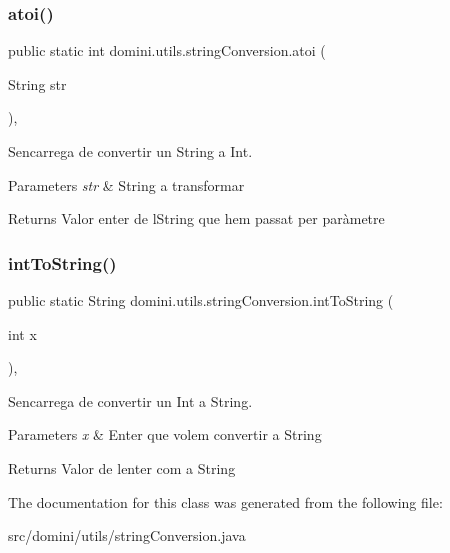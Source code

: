\subsubsection{\texorpdfstring{atoi()}{atoi()}}
{\footnotesize\ttfamily public static int domini.\+utils.\+string\+Conversion.\+atoi (\begin{DoxyParamCaption}\item[{String}]{str }\end{DoxyParamCaption})\hspace{0.3cm}{\ttfamily [inline]}, {\ttfamily [static]}}



S\textquotesingle{}encarrega de convertir un String a Int. 


\begin{DoxyParams}{Parameters}
{\em str} & String a transformar \\
\hline
\end{DoxyParams}
\begin{DoxyReturn}{Returns}
Valor enter de l\textquotesingle{}String que hem passat per paràmetre 
\end{DoxyReturn}
\mbox{\label{classdomini_1_1utils_1_1stringConversion_ab10fa673e68698a6a0f29971a60fe274}} 
\subsubsection{\texorpdfstring{int\+To\+String()}{intToString()}}
{\footnotesize\ttfamily public static String domini.\+utils.\+string\+Conversion.\+int\+To\+String (\begin{DoxyParamCaption}\item[{int}]{x }\end{DoxyParamCaption})\hspace{0.3cm}{\ttfamily [inline]}, {\ttfamily [static]}}



S\textquotesingle{}encarrega de convertir un Int a String. 


\begin{DoxyParams}{Parameters}
{\em x} & Enter que volem convertir a String \\
\hline
\end{DoxyParams}
\begin{DoxyReturn}{Returns}
Valor de l\textquotesingle{}enter com a String 
\end{DoxyReturn}


The documentation for this class was generated from the following file\+:\begin{DoxyCompactItemize}
\item 
src/domini/utils/string\+Conversion.\+java\end{DoxyCompactItemize}
